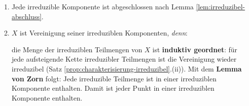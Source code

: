 \begin{rem}
  \label{rem:irreduzibel}
  \mbox{}
  \begin{enumerate}
  \item Jede irreduzible Komponente ist abgeschlossen nach Lemma \ref{lem:irreduzibel-abschluss}.
  \item $X$ ist Vereinigung seiner irreduziblen Komponenten, \emph{denn}: 

    die Menge der irreduziblen Teilmengen von $X$ ist \textbf{induktiv
      geordnet}: für jede aufsteigende Kette irreduzibler Teilmengen ist
    die Vereinigung wieder irreduzibel (Satz \ref{prop:charakterisierung-irreduzibel}.(ii)). Mit dem \textbf{Lemma
      von Zorn} folgt: Jede irreduzible Teilmenge ist in einer irreduziblen
    Komponente enthalten. Damit ist jeder Punkt in einer irreduziblen
    Komponente enthalten.
  \end{enumerate}
\end{rem}

